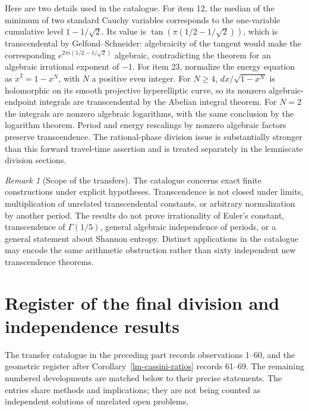 \documentclass[11pt,a4paper]{article}
\theoremstyle{definition}
\theoremstyle{remark}
\newtheorem{remark}[theorem]{Remark}
\numberwithin{equation}{section}
\begin{document}
Here are two details used in the catalogue.  For item 12, the median of
the minimum of two standard Cauchy variables corresponds to the
one-variable cumulative level $1-1/\sqrt2$.  Its value is
$\tan(\pi(1/2-1/\sqrt2))$, which is transcendental by
Gelfond--Schneider: algebraicity of the tangent would make the
corresponding $e^{2\pi i(1/2-1/\sqrt2)}$ algebraic, contradicting the
theorem for an algebraic irrational exponent of $-1$.
For item 23, normalize the energy equation as $\dot x^2=1-x^N$,
with $N$ a positive even integer.  For $N\ge4$, $dx/\sqrt{1-x^N}$
is holomorphic on its smooth projective hyperelliptic curve, so its
nonzero algebraic-endpoint integrals are transcendental by the Abelian
integral theorem.  For $N=2$ the integrals are nonzero algebraic
logarithms, with the same conclusion by the logarithm theorem.
Period and energy rescalings by nonzero algebraic factors preserve
transcendence.  The rational-phase division issue is substantially
stronger than this forward travel-time assertion and is treated
separately in the lemniscate division sections.

\begin{remark}[Scope of the transfers]\label{tf-scope}
The catalogue concerns exact finite constructions under explicit
hypotheses.  Transcendence is not closed under limits, multiplication
of unrelated transcendental constants, or arbitrary normalization by
another period.  The results do not prove irrationality of Euler's
constant, transcendence of $\Gamma(1/5)$, general algebraic independence
of periods, or a general statement about Shannon entropy.  Distinct
applications in the catalogue may encode the same arithmetic
obstruction rather than sixty independent new transcendence theorems.
\end{remark}


\clearpage
\appendix
\section{Register of the final division and independence results}
\label{app-register}
The transfer catalogue in the preceding part records observations
1--60, and the geometric register after
Corollary~\ref{lm-cassini-ratios} records 61--69. The remaining
numbered developments are matched below to their precise statements.
The entries share methods and implications; they are not being counted
as independent solutions of unrelated open problems.
\end{document}
